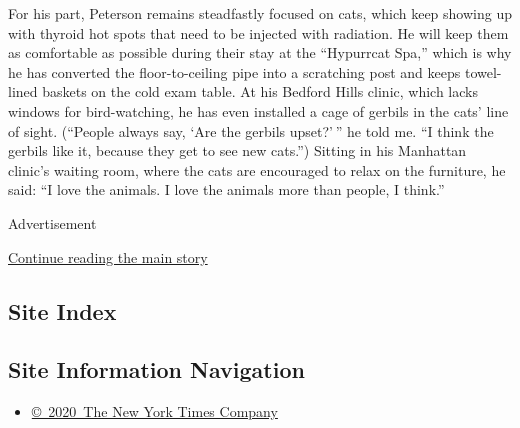 For his part, Peterson remains steadfastly focused on cats, which keep
showing up with thyroid hot spots that need to be injected with
radiation. He will keep them as comfortable as possible during their
stay at the ``Hypurrcat Spa,'' which is why he has converted the
floor-to-ceiling pipe into a scratching post and keeps towel-lined
baskets on the cold exam table. At his Bedford Hills clinic, which lacks
windows for bird-watching, he has even installed a cage of gerbils in
the cats' line of sight. (``People always say, `Are the gerbils
upset?' '' he told me. ``I think the gerbils like it, because they get
to see new cats.'') Sitting in his Manhattan clinic's waiting room,
where the cats are encouraged to relax on the furniture, he said: ``I
love the animals. I love the animals more than people, I think.''

Advertisement

\protect\hyperlink{after-bottom}{Continue reading the main story}

\hypertarget{site-index}{%
\subsection{Site Index}\label{site-index}}

\hypertarget{site-information-navigation}{%
\subsection{Site Information
Navigation}\label{site-information-navigation}}

\begin{itemize}
\tightlist
\item
  \href{https://help.nytimes3xbfgragh.onion/hc/en-us/articles/115014792127-Copyright-notice}{©~2020~The
  New York Times Company}
\end{itemize}

